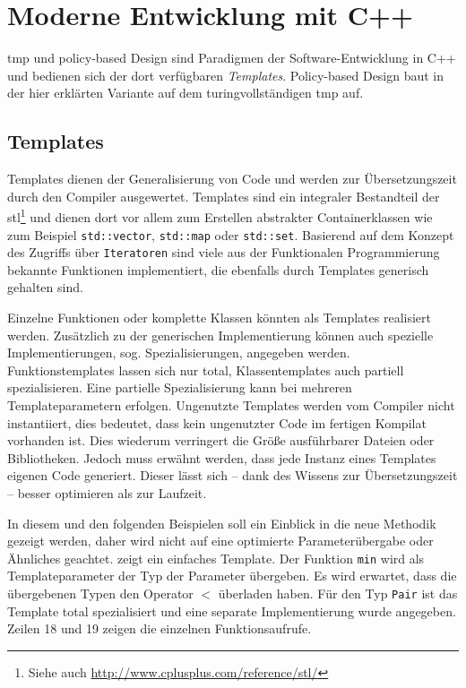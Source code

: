 \section{Moderne Entwicklung mit C++}
\label{chap:impl_tmp}
\acf{tmp} und policy-based Design \cite{Alexandrescu2001Modern} sind Paradigmen der Software-Entwicklung in C++ und bedienen sich der dort verfügbaren \emph{Templates}. Policy-based Design baut in der hier erklärten Variante auf dem turingvollständigen \ac{tmp} auf.

\subsection{Templates}
Templates dienen der Generalisierung von Code und werden zur Übersetzungszeit durch den Compiler ausgewertet. Templates sind ein integraler Bestandteil der \ac{stl}\footnote{Siehe auch \url{http://www.cplusplus.com/reference/stl/}} und dienen dort vor allem zum Erstellen abstrakter Containerklassen wie zum Beispiel \texttt{std::vector}, \texttt{std::map} oder \texttt{std::set}. Basierend auf dem Konzept des Zugriffs über \texttt{Iteratoren} sind viele aus der Funktionalen Programmierung bekannte Funktionen implementiert, die ebenfalls durch Templates generisch gehalten sind.

Einzelne Funktionen oder komplette Klassen könnten als Templates realisiert werden. Zusätzlich zu der generischen Implementierung können auch spezielle Implementierungen, sog. Spezialisierungen, angegeben werden. Funktionstemplates lassen sich nur total, Klassentemplates auch partiell spezialisieren. Eine partielle Spezialisierung kann bei mehreren Templateparametern erfolgen. Ungenutzte Templates werden vom Compiler nicht instantiiert, dies bedeutet, dass kein ungenutzter Code im fertigen Kompilat vorhanden ist. Dies wiederum verringert die Größe ausführbarer Dateien oder Bibliotheken. Jedoch muss erwähnt werden, dass jede Instanz eines Templates eigenen Code generiert. Dieser lässt sich -- dank des Wissens zur Übersetzungszeit -- besser optimieren als zur Laufzeit.

In diesem und den folgenden Beispielen soll ein Einblick in die neue Methodik gezeigt werden, daher wird nicht auf eine optimierte Parameterübergabe oder Ähnliches geachtet.  zeigt ein einfaches Template. Der Funktion \texttt{min} wird als Templateparameter der Typ der Parameter übergeben. Es wird erwartet, dass die übergebenen Typen den Operator $<$ überladen haben. Für den Typ \texttt{Pair} ist das Template total spezialisiert und eine separate Implementierung wurde angegeben. Zeilen 18 und 19 zeigen die einzelnen Funktionsaufrufe.


